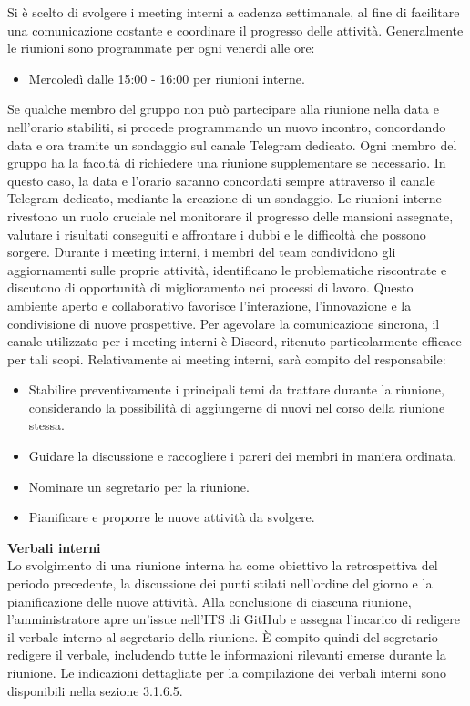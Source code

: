 Si è scelto di svolgere i meeting interni a cadenza settimanale, al fine di facilitare una comunicazione costante e coordinare il progresso delle attività.
Generalmente le riunioni sono programmate per ogni venerdi alle ore:
\begin{itemize}
    \item Mercoledì dalle 15:00 - 16:00 per riunioni interne.
\end{itemize}
Se qualche membro del gruppo non può partecipare alla riunione nella data e nell’orario stabiliti, si procede programmando un nuovo incontro, concordando data e ora tramite un sondaggio sul canale Telegram dedicato.
Ogni membro del gruppo ha la facoltà di richiedere una riunione supplementare se necessario. In questo caso, la data e l’orario saranno concordati sempre attraverso il canale Telegram dedicato, mediante la creazione di un sondaggio.
Le riunioni interne rivestono un ruolo cruciale nel monitorare il progresso delle mansioni assegnate, valutare i risultati conseguiti e affrontare i dubbi e le difficoltà che possono sorgere. Durante i meeting interni, i membri del team condividono gli aggiornamenti sulle proprie attività, identificano le problematiche riscontrate e discutono di opportunità di miglioramento nei processi di lavoro. Questo ambiente aperto e collaborativo favorisce l’interazione, l’innovazione e la condivisione di nuove prospettive. Per agevolare la comunicazione sincrona, il canale utilizzato per i meeting interni è Discord, ritenuto particolarmente efficace per tali scopi.
Relativamente ai meeting interni, sarà compito del responsabile:
\begin{itemize}
    \item Stabilire preventivamente i principali temi da trattare durante la riunione, considerando la possibilità di aggiungerne di nuovi nel corso della riunione stessa.
    \item Guidare la discussione e raccogliere i pareri dei membri in maniera ordinata.
    \item Nominare un segretario per la riunione.
    \item Pianificare e proporre le nuove attività da svolgere.
\end{itemize}
\textbf{Verbali interni}\\
Lo svolgimento di una riunione interna ha come obiettivo la retrospettiva del periodo precedente, la discussione dei punti stilati nell’ordine del giorno e la pianificazione delle nuove attività.
Alla conclusione di ciascuna riunione, l’amministratore apre un’issue nell’ITS di GitHub e assegna l’incarico di redigere il verbale interno al segretario della riunione. È compito quindi del segretario redigere il verbale, includendo tutte le informazioni rilevanti emerse durante la riunione. Le indicazioni dettagliate per la compilazione dei verbali interni sono disponibili nella sezione 3.1.6.5.


